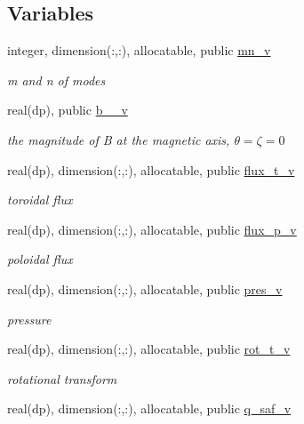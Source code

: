 \subsection*{Variables}
\begin{DoxyCompactItemize}
\item 
integer, dimension(\+:,\+:), allocatable, public \hyperlink{namespacevmec__vars_a4b9a64bc60d45f2b10e03f624ade3e82}{mn\+\_\+v}
\begin{DoxyCompactList}\small\item\em m and n of modes \end{DoxyCompactList}\item 
real(dp), public \hyperlink{namespacevmec__vars_a71e1a738f0e423fe6c284f8ea636008e}{b\+\_\+\_\+v}
\begin{DoxyCompactList}\small\item\em the magnitude of B at the magnetic axis, $\theta = \zeta = 0$ \end{DoxyCompactList}\item 
real(dp), dimension(\+:,\+:), allocatable, public \hyperlink{namespacevmec__vars_ac246a5937702b1ac4c7f9bd92d286766}{flux\+\_\+t\+\_\+v}
\begin{DoxyCompactList}\small\item\em toroidal flux \end{DoxyCompactList}\item 
real(dp), dimension(\+:,\+:), allocatable, public \hyperlink{namespacevmec__vars_aeac5e1262f419b7ae674586f576dc928}{flux\+\_\+p\+\_\+v}
\begin{DoxyCompactList}\small\item\em poloidal flux \end{DoxyCompactList}\item 
real(dp), dimension(\+:,\+:), allocatable, public \hyperlink{namespacevmec__vars_a958baf9fece8a4a001b6d8d767b48179}{pres\+\_\+v}
\begin{DoxyCompactList}\small\item\em pressure \end{DoxyCompactList}\item 
real(dp), dimension(\+:,\+:), allocatable, public \hyperlink{namespacevmec__vars_a676475bc7e07d96fc91c2773c8d2c84a}{rot\+\_\+t\+\_\+v}
\begin{DoxyCompactList}\small\item\em rotational transform \end{DoxyCompactList}\item 
real(dp), dimension(\+:,\+:), allocatable, public \hyperlink{namespacevmec__vars_a08f3862b0bb940623a416a056f03b092}{q\+\_\+saf\+\_\+v}

\end{DoxyCompactItemize}
